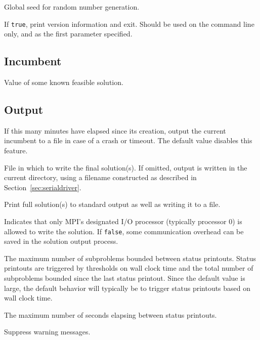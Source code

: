 Global seed for random number generation.

If \texttt{true}, print version information and exit. Should be used  on
the command line only, and as the first parameter specified.


\subsection{Incumbent}
\vspace{-3ex}
Value of some known feasible solution.

\subsection{Output}
\vspace{-3ex}
If this many minutes have elapsed since its creation,
output the current incumbent to a file in case of
a crash or timeout.  The default value disables this
feature.

File in which to write the final solution(s).  If omitted, output is
written in the current directory, using a filename constructed as
described in Section~\ref{sec:serialdriver}.

Print full solution(s) to standard output as well as writing it to a file.

 Indicates that only
MPI's designated I/O processor (typically processor 0) is allowed to
write the solution.  If \texttt{false}, some communication overhead
can be saved in the solution output process.

The maximum number of subproblems bounded between status printouts.
Status printouts are triggered by thresholds on wall clock time and the
total number of subproblems bounded since the last status printout.
Since the default value is large, the default behavior will typically
be to trigger status printouts based on wall clock time.

The maximum number of seconds elapsing between status printouts.

Suppress warning messages.

